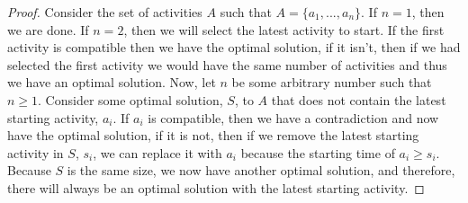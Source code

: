 \documentclass[12pt, letterpaper]{article}
\begin{document}
\begin{proof}
Consider the set of activities $A$ such that $A = \{a_1, ..., a_n\}$. If $n = 1$, then we are done. If $n = 2$, then we will select the latest activity to start. If the first activity is compatible then we have the optimal solution, if it isn't, then if we had selected the first activity we would have the same number of activities and thus we have an optimal solution. Now, let $n$ be some arbitrary number such that $n \geq 1$. Consider some optimal solution, $S$, to $A$ that does not contain the latest starting activity, $a_i$. If $a_i$ is compatible, then we have a contradiction and now have the optimal solution, if it is not, then if we remove the latest starting activity in $S$, $s_i$, we can replace it with $a_i$ because the starting time of $a_i \geq s_i$. Because $S$ is the same size, we now have another optimal solution, and therefore, there will always be an optimal solution with the latest starting activity.
\end{proof}
\end{document}
